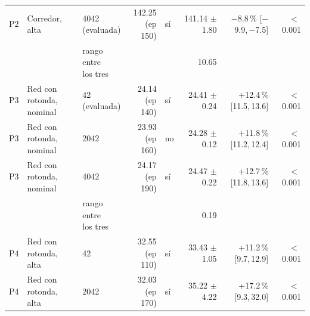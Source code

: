 \begin{table}[H]
\begin{tabular}{lllrlrrr}
P2 & \makecell[l]{Corredor,\\{}alta} & \makecell[l]{4042\\{}(evaluada)} & \makecell[r]{142.25\\{}(ep 150)} & sí & \makecell[r]{141.14\\{}$\pm$ 1.80} & \makecell[r]{$-$8.8\,\%\\{}[$-$9.9,\,$-$7.5]} & $<$\,0.001 \\
 & & \makecell[l]{rango entre\\{}los tres} & & & 10.65 & & \\
P3 & \makecell[l]{Red con rotonda,\\{}nominal} & \makecell[l]{42\\{}(evaluada)} & \makecell[r]{24.14\\{}(ep 140)} & sí & \makecell[r]{24.41\\{}$\pm$ 0.24} & \makecell[r]{+12.4\,\%\\{}[11.5,\,13.6]} & $<$\,0.001 \\
P3 & \makecell[l]{Red con rotonda,\\{}nominal} & 2042 & \makecell[r]{23.93\\{}(ep 160)} & no & \makecell[r]{24.28\\{}$\pm$ 0.12} & \makecell[r]{+11.8\,\%\\{}[11.2,\,12.4]} & $<$\,0.001 \\
P3 & \makecell[l]{Red con rotonda,\\{}nominal} & 4042 & \makecell[r]{24.17\\{}(ep 190)} & sí & \makecell[r]{24.47\\{}$\pm$ 0.22} & \makecell[r]{+12.7\,\%\\{}[11.8,\,13.6]} & $<$\,0.001 \\
 & & \makecell[l]{rango entre\\{}los tres} & & & 0.19 & & \\
P4 & \makecell[l]{Red con rotonda,\\{}alta} & 42 & \makecell[r]{32.55\\{}(ep 110)} & sí & \makecell[r]{33.43\\{}$\pm$ 1.05} & \makecell[r]{+11.2\,\%\\{}[9.7,\,12.9]} & $<$\,0.001 \\
P4 & \makecell[l]{Red con rotonda,\\{}alta} & 2042 & \makecell[r]{32.03\\{}(ep 170)} & sí & \makecell[r]{35.22\\{}$\pm$ 4.22} & \makecell[r]{+17.2\,\%\\{}[9.3,\,32.0]} & $<$\,0.001 \\

\end{tabular}
\end{table}
